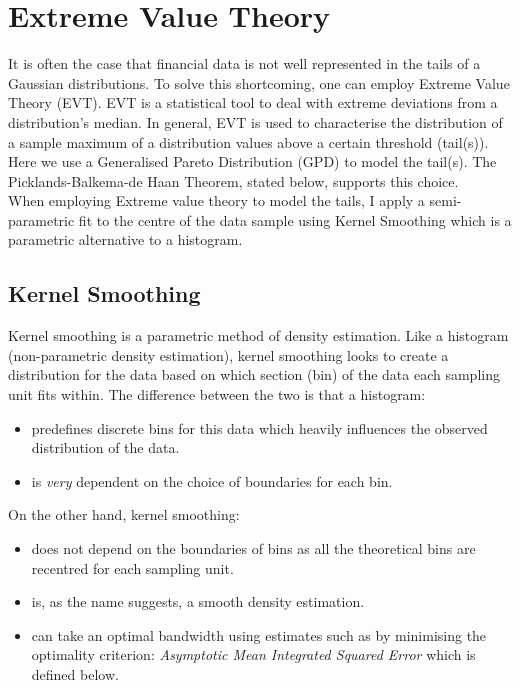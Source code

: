 \documentclass{report}
\theoremstyle{plain}
\theoremstyle{definition}
\begin{document}
\section{Extreme Value Theory}

It is often the case that financial data is not well represented in the tails of a Gaussian distributions. To solve this shortcoming, one can employ Extreme Value Theory (EVT). EVT is a statistical tool to deal with extreme deviations from a distribution's median. In general, EVT is used to characterise the distribution of a sample maximum of a distribution values above a certain threshold (tail(s)).\\ 
Here we use a Generalised Pareto Distribution (GPD) to model the tail(s). The Picklands-Balkema-de Haan Theorem, stated below, supports this choice.\\ 
When employing Extreme value theory to model the tails, I apply a semi-parametric fit to the centre of the data sample using Kernel Smoothing which is a parametric alternative to a histogram.\\

\subsection{Kernel Smoothing}

Kernel smoothing is a parametric method of density estimation. Like a histogram (non-parametric density estimation), kernel smoothing looks to create a distribution for the data based on which section (bin) of the data each sampling unit fits within. The difference between the two is that a histogram:
\begin{itemize}
	\item predefines discrete bins for this data which heavily influences the observed distribution of the data.
	\item is \emph{very} dependent on the choice of boundaries for each bin.
\end{itemize}
On the other hand, kernel smoothing:
\begin{itemize}
	\item does not depend on the boundaries of bins as all the theoretical bins are recentred for each sampling unit.
	\item is, as the name suggests, a smooth density estimation.
	\item can take an optimal bandwidth using estimates such as by minimising the optimality criterion: \textit{Asymptotic Mean Integrated Squared Error} which is defined below.
\end{itemize}
\end{document}
